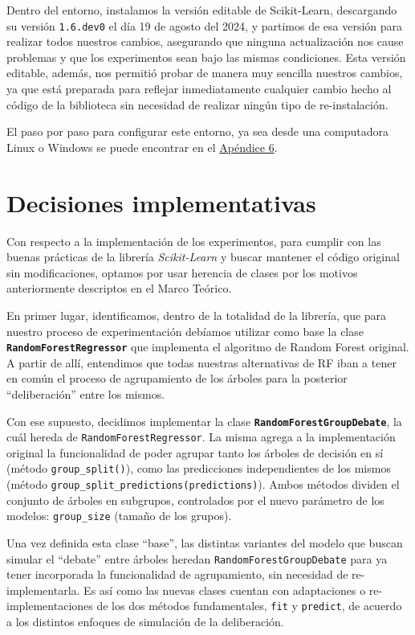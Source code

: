 Dentro del entorno, instalamos la versión editable de Scikit-Learn, descargando su versión \texttt{1.6.dev0} el día 19 de agosto del 2024, y partimos de esa versión para realizar todos nuestros cambios, asegurando que ninguna actualización nos cause problemas y que los experimentos sean bajo las mismas condiciones. Esta versión editable, además, nos permitió probar de manera muy sencilla nuestros cambios, ya que está preparada para reflejar inmediatamente cualquier cambio hecho al código de la biblioteca sin necesidad de realizar ningún tipo de re-instalación.

El paso por paso para configurar este entorno, ya sea desde una computadora Linux o Windows se puede encontrar en el \hyperref[appendix6]{Apéndice 6}.

\section{Decisiones implementativas}

Con respecto a la implementación de los experimentos, para cumplir con las buenas prácticas de la librería \textit{Scikit-Learn} y buscar mantener el código original sin modificaciones, optamos por usar herencia de clases por los motivos anteriormente descriptos en el Marco Teórico.

En primer lugar, identificamos, dentro de la totalidad de la librería, que para nuestro proceso de experimentación debíamos utilizar como base la clase \textbf{\texttt{RandomForestRegressor}} que implementa el algoritmo de Random Forest original. A partir de allí, entendimos que todas nuestras alternativas de RF iban a tener en común el proceso de agrupamiento de los árboles para la posterior “deliberación” entre los mismos.

Con ese supuesto, decidimos implementar la clase \textbf{\texttt{RandomForestGroupDebate}}, la cuál hereda de \texttt{RandomForestRegressor}. La misma agrega a la implementación original la funcionalidad de poder agrupar tanto los árboles de decisión en sí (método \texttt{group\_split()}), como las predicciones independientes de los mismos (método \texttt{group\_split\_predictions(predictions)}). Ambos métodos dividen el conjunto de árboles en subgrupos, controlados por el nuevo parámetro de los modelos: \texttt{group\_size} (tamaño de los grupos).

Una vez definida esta clase “base”, las distintas variantes del modelo que buscan simular el “debate” entre árboles heredan \texttt{RandomForestGroupDebate} para ya tener incorporada la funcionalidad de agrupamiento, sin necesidad de re-implementarla. Es así como las nuevas clases cuentan con adaptaciones o re-implementaciones de los dos métodos fundamentales, \texttt{fit} y \texttt{predict}, de acuerdo a los distintos enfoques de simulación de la deliberación. 

